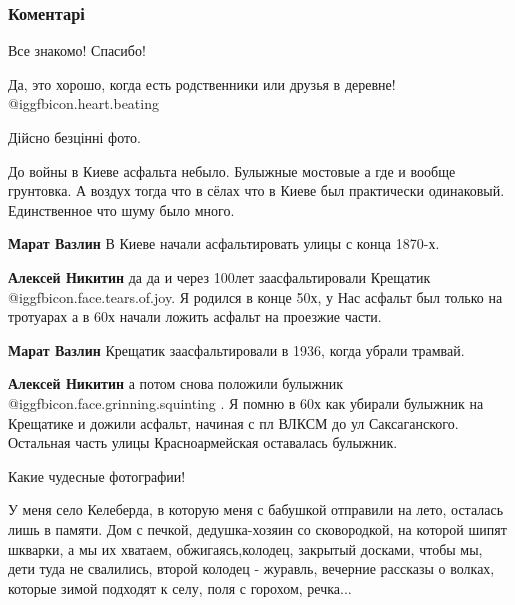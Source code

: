  
 
 
 
 
\subsubsection{Коментарі}
\label{sec:28_11_2021.fb.fb_group.stari_fotografii.1.sadok_vyshnevyj.cmt}

\begin{itemize} %

Все знакомо! Спасибо!

Да, это хорошо, когда есть родственники или друзья в деревне! @igg{fbicon.heart.beating} 

Дійсно безцінні фото.


До войны в Киеве асфальта небыло. Булыжные мостовые а где и вообще грунтовка. А
воздух тогда что в сёлах что в Киеве был практически одинаковый. Единственное
что шуму было много.

\begin{itemize} %
\textbf{Марат Вазлин} В Киеве начали асфальтировать улицы с конца 1870-х.

\textbf{Алексей Никитин} да да и через 100лет заасфальтировали Крещатик  @igg{fbicon.face.tears.of.joy}. Я родился в конце 50х, у Нас асфальт был только на тротуарах а в 60х начали ложить асфальт на проезжие части.

\textbf{Марат Вазлин} Крещатик заасфальтировали в 1936, когда убрали трамвай.

\textbf{Алексей Никитин} а потом снова положили булыжник  @igg{fbicon.face.grinning.squinting} . Я помню в 60х как убирали булыжник на Крещатике и дожили асфальт, начиная с пл ВЛКСМ до ул Саксаганского. Остальная часть улицы Красноармейская оставалась булыжник.
\end{itemize} %


Какие чудесные фотографии!

У меня село Келеберда, в которую меня с бабушкой отправили на лето, осталась
лишь в памяти. Дом с печкой, дедушка-хозяин со сковородкой, на которой шипят
шкварки, а мы их хватаем, обжигаясь,колодец, закрытый досками, чтобы мы, дети
туда не свалились, второй колодец - журавль, вечерние рассказы о волках,
которые зимой подходят к селу, поля с горохом, речка...


\end{itemize}
